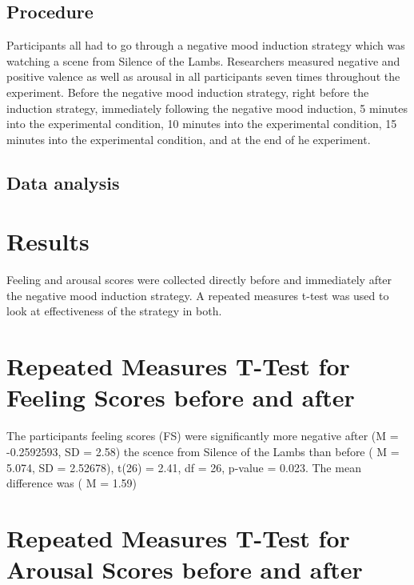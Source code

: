 \documentclass[
  english,
  man]{apa6}
\begin{document}
\hypertarget{procedure}{%
\subsection{Procedure}\label{procedure}}

Participants all had to go through a negative mood induction strategy which was watching a scene from Silence of the Lambs. Researchers measured negative and positive valence as well as arousal in all participants seven times throughout the experiment. Before the negative mood induction strategy, right before the induction strategy, immediately following the negative mood induction, 5 minutes into the experimental condition, 10 minutes into the experimental condition, 15 minutes into the experimental condition, and at the end of he experiment.

\hypertarget{data-analysis}{%
\subsection{Data analysis}\label{data-analysis}}

\hypertarget{results}{%
\section{Results}\label{results}}

Feeling and arousal scores were collected directly before and immediately after the negative mood induction strategy. A repeated measures t-test was used to look at effectiveness of the strategy in both.

\hypertarget{repeated-measures-t-test-for-feeling-scores-before-and-after}{%
\section{Repeated Measures T-Test for Feeling Scores before and after}\label{repeated-measures-t-test-for-feeling-scores-before-and-after}}

The participants feeling scores (FS) were significantly more negative after (M = -0.2592593, SD = 2.58) the scence from Silence of the Lambs than before ( M = 5.074, SD = 2.52678), t(26) = 2.41, df = 26, p-value = 0.023. The mean difference was ( M = 1.59)

\hypertarget{repeated-measures-t-test-for-arousal-scores-before-and-after}{%
\section{Repeated Measures T-Test for Arousal Scores before and after}\label{repeated-measures-t-test-for-arousal-scores-before-and-after}}
\end{document}
